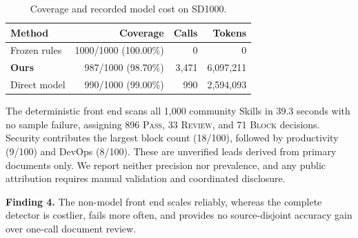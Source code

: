 \begin{table}[!t]
\centering
\caption{Coverage and recorded model cost on SD1000.}
\label{tab:reliability}
\small
\begin{tabular}{lrrr}
\toprule
Method & Coverage & Calls & Tokens \\
\midrule
Frozen rules & 1000/1000 (100.00\%) & 0 & 0 \\
\textbf{Ours} & 987/1000 (98.70\%) & 3,471 & 6,097,211 \\
Direct model & 990/1000 (99.00\%) & 990 & 2,594,093 \\
\bottomrule
\end{tabular}
\end{table}

The deterministic front end scans all 1,000 community Skills in 39.3 seconds
with no sample failure, assigning 896 \textsc{Pass}, 33 \textsc{Review}, and
71 \textsc{Block} decisions. Security contributes the largest block count
(18/100), followed by productivity (9/100) and DevOps (8/100). These are
unverified leads derived from primary documents only. We report neither
precision nor prevalence, and any public attribution requires manual validation
and coordinated disclosure.

\noindent\textbf{Finding 4.} The non-model front end scales reliably, whereas
the complete detector is costlier, fails more often, and provides no
source-disjoint accuracy gain over one-call document review.
